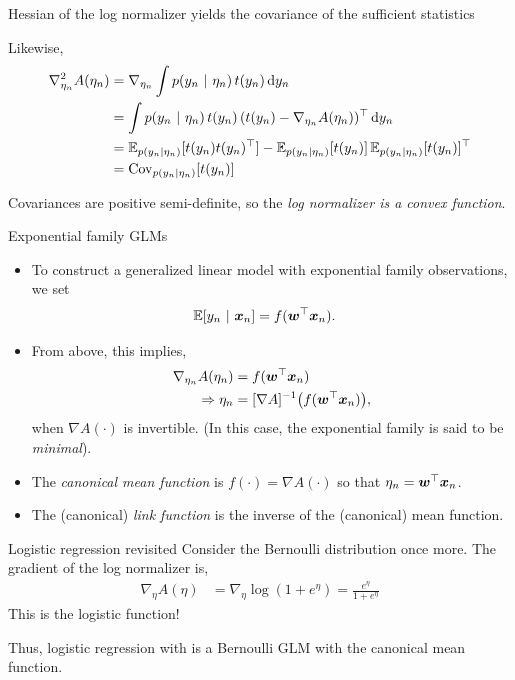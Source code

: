 \documentclass[aspectratio=169]{beamer}
\begin{document}
\begin{frame}{Hessian of the log normalizer yields the covariance of the sufficient statistics}
    
    Likewise,
    \begin{align}
        \nabla^2_{\eta_n} A(\eta_n) 
        &= \nabla_{\eta_n} \int p(y_n ~\vert~ \eta_n) \, t(y_n) \mathop{}\!\mathrm{d} y_n \\
        &= \int p(y_n ~\vert~ \eta_n) \, t(y_n) \, (t(y_n) - \nabla_{\eta_n} A(\eta_n))^\top \mathop{}\!\mathrm{d} y_n \\
        &= \mathbb{E}_{p(y_n | \eta_n)}[t(y_n) t(y_n)^\top ] - \mathbb{E}_{p(y_n | \eta_n)}[t(y_n)] \, \mathbb{E}_{p(y_n | \eta_n)}[t(y_n)]^\top \\
        &= \mathrm{Cov}_{p(y_n | \eta_n)}[t(y_n)]
    \end{align}
    
    Covariances are positive semi-definite, so the \textit{log normalizer is a convex function}.
\end{frame}

\begin{frame}{Exponential family GLMs}
    \begin{itemize}
        \item To construct a generalized linear model with exponential family observations, we set 
    \begin{align}
        \mathbb{E}[y_n ~\vert~ \boldsymbol{x}_n] &= f(\boldsymbol{w}^\top \boldsymbol{x}_n).
    \end{align}
    
    \item From above, this implies,
    \begin{align}
        \nabla_{\eta_n} A(\eta_n) &= f(\boldsymbol{w}^\top \boldsymbol{x}_n) \\
        \Rightarrow \eta_n &= [\nabla A]^{-1} \big( f(\boldsymbol{w}^\top \boldsymbol{x}_n) \big),
    \end{align}
    when $\nabla A(\cdot)$ is invertible. (In this case, the exponential family is said to be \emph{minimal}).
    
    \item The \emph{canonical mean function} is $f(\cdot) = \nabla A(\cdot)$ so that $\eta_n = \boldsymbol{w}^\top \boldsymbol{x}_n$.
    
    \item The (canonical) \emph{link function} is the inverse of the (canonical) mean function.
    \end{itemize}
    
\end{frame}

\begin{frame}{Logistic regression revisited}
    Consider the Bernoulli distribution once more. The gradient of the log normalizer is,
    \begin{align}
        \nabla_\eta A(\eta) &= \nabla_\eta \log (1 + e^\eta) 
        = \frac{e^\eta}{1+ e^\eta}
    \end{align}
    This is the logistic function!
    
    Thus, logistic regression with is a Bernoulli GLM with the canonical mean function.
\end{frame}
\end{document}
